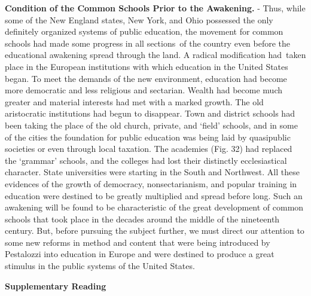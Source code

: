 \documentclass[]{book}
\begin{document}
\textbf{Condition of the Common Schools Prior to the Awakening.} - Thus, while some of the New England states, New York, and Ohio possessed the only definitely organized systems of public education, the movement for common schools had made some progress in all sections~of the country even before the educational awakening spread through the land. A radical modification had~taken place in the European institutions with which education in the United States began. To meet the demands of the new environment, education had become more democratic and less religious and sectarian. Wealth had become much greater and material interests had met with a marked growth. The old aristocratic institutions had begun to disappear. Town and district schools had been taking the place of the old church, private, and `field' schools, and in some of the cities the foundation for public education was being laid by quasipublic societies or even through local taxation. The academies (Fig. 32) had replaced the `grammar' schools, and the colleges had lost their distinctly ecclesiastical character. State universities were starting in the South and Northwest. All these evidences of the growth of democracy, nonsectarianism, and popular training in education were destined to be greatly multiplied and spread before long. Such an awakening will be found to be characteristic of the great development of common schools that took place in the decades around the middle of the nineteenth century. But, before pursuing the subject further, we must direct our attention to some new reforms in method and content that were being introduced by Pestalozzi into education in Europe and were destined to produce a great stimulus in the public systems of the United States.

\textbf{Supplementary Reading}
\end{document}
